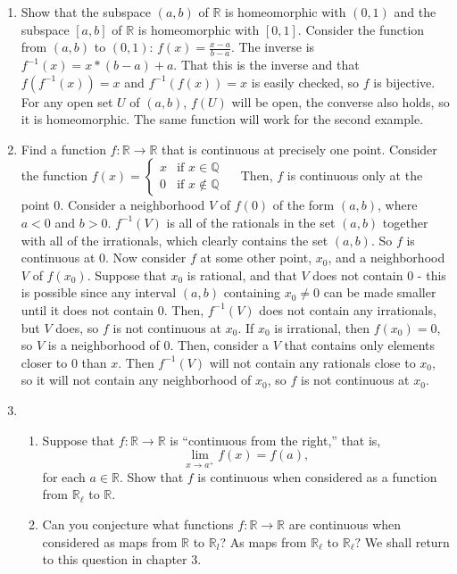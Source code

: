 \documentclass[12pt,letterpaper]{article}
\begin{document}
\begin{enumerate}
  \item Show that the subspace $(a,b)$ of $\mathbb{R}$ is homeomorphic with $(0,1)$ and the subspace $[a,b]$ of $\mathbb{R}$ is homeomorphic with $[0,1]$.\n
  \indent Consider the function from $(a,b)$ to $(0,1)$: $f(x)=\frac{x-a}{b-a}$. The inverse is $f^{-1}(x)=x*(b-a)+a$. That this is the inverse and that $f(f^{-1}(x)) = x$ and $f^{-1}(f(x))=x$ is easily checked, so $f$ is bijective. For any open set $U$ of $(a,b)$, $f(U)$ will be open, the converse also holds, so it is homeomorphic. The same function will work for the second example.
  \item Find a function $f: \mathbb{R}\rightarrow \mathbb{R}$ that is continuous at precisely one point.\hspace{5in}\n
  \indent Consider the function $f(x) = \begin{cases} x & \text{if } x\in\mathbb{Q} \\ 0 & \text{if } x\not\in\mathbb{Q}\end{cases}\quad$ Then, $f$ is continuous only at the point 0. \hspace{3in}\n
  Consider a neighborhood $V$ of $f(0)$ of the form $(a,b)$, where $a<0$ and $b>0$. $f^{-1}(V)$ is all of the rationals in the set $(a,b)$ together with all of the irrationals, which clearly contains the set $(a,b)$. So $f$ is continuous at 0. Now consider $f$ at some other point, $x_0$, and a neighborhood $V$ of $f(x_0)$. Suppose that $x_0$ is rational, and that $V$ does not contain 0 - this is possible since any interval $(a,b)$ containing $x_0\neq 0$ can be made smaller until it does not contain 0. Then, $f^{-1}(V)$ does not contain any irrationals, but $V$ does, so $f$ is not continuous at $x_0$. If $x_0$ is irrational, then $f(x_0)=0$, so $V$ is a neighborhood of $0$. Then, consider a $V$ that contains only elements closer to 0 than $x$. Then $f^{-1}(V)$ will not contain any rationals close to $x_0$, so it will not contain any neighborhood of $x_0$, so $f$ is not continuous at $x_0$.
  \item
  \begin{enumerate}
    \item Suppose that $f: \mathbb{R} \rightarrow \mathbb{R}$ is ``continuous from the right,'' that is, $$\lim_{x\rightarrow a^+} f(x)=f(a),$$ for each $a\in\mathbb{R}$. Show that $f$ is continuous when considered as a function from $\mathbb{R}_\ell$ to $\mathbb{R}$.\hspace{5in}\n
    \item Can you conjecture what functions $f:\mathbb{R}\rightarrow \mathbb{R}$ are continuous when considered as maps from $\mathbb{R}$ to $\mathbb{R}_l$? As maps from $\mathbb{R}_\ell$ to $\mathbb{R}_\ell?$ We shall return to this question in chapter 3.

\end{enumerate}
\end{enumerate}
\end{document}

